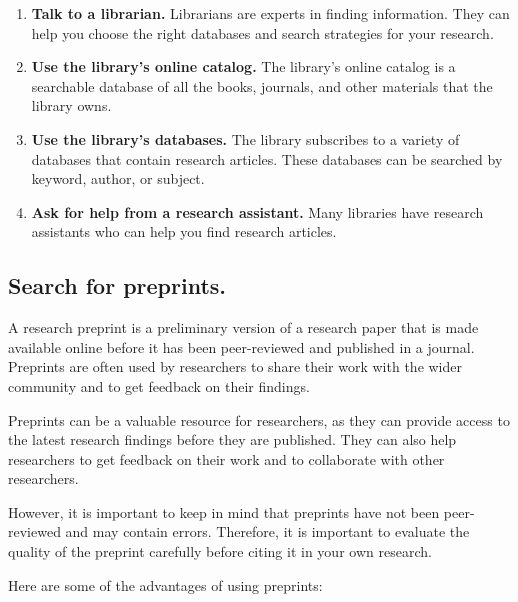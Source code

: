 \documentclass[
  b5paper]{book}
\begin{document}
\begin{enumerate}
\def\labelenumi{\arabic{enumi}.}
\item
  \textbf{Talk to a librarian.} Librarians are experts in finding information. They can help you choose the right databases and search strategies for your research.
\item
  \textbf{Use the library's online catalog.} The library's online catalog is a searchable database of all the books, journals, and other materials that the library owns.
\item
  \textbf{Use the library's databases.} The library subscribes to a variety of databases that contain research articles. These databases can be searched by keyword, author, or subject.
\item
  \textbf{Ask for help from a research assistant.} Many libraries have research assistants who can help you find research articles.
\end{enumerate}

\hypertarget{search-for-preprints.}{%
\subsection*{Search for preprints.}\label{search-for-preprints.}}

A research preprint is a preliminary version of a research paper that is made available online before it has been peer-reviewed and published in a journal. Preprints are often used by researchers to share their work with the wider community and to get feedback on their findings.

Preprints can be a valuable resource for researchers, as they can provide access to the latest research findings before they are published. They can also help researchers to get feedback on their work and to collaborate with other researchers.

However, it is important to keep in mind that preprints have not been peer-reviewed and may contain errors. Therefore, it is important to evaluate the quality of the preprint carefully before citing it in your own research.

Here are some of the advantages of using preprints:
\end{document}
